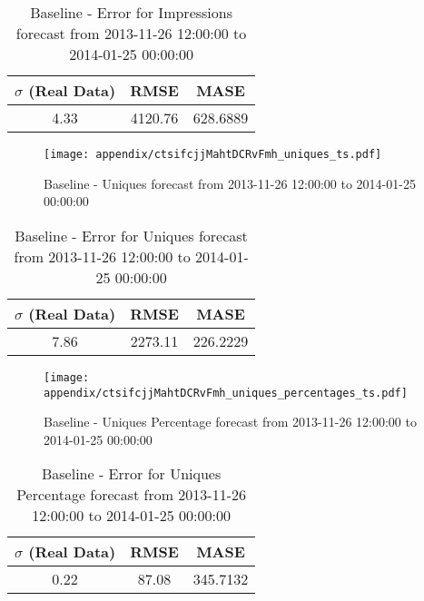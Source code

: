\begin{table}[H]
\centering
\footnotesize
\begin{tabular}{ccc}
$\sigma$ (Real Data) & RMSE & MASE   \\ \hline
4.33 & 4120.76 & 628.6889 \\
\end{tabular}

\vspace{0.5cm}

\caption{
Baseline - Error for Impressions forecast from 2013-11-26 12:00:00 to 2014-01-25 00:00:00}
\end{table}

\begin{figure}[H] \begin{center} \leavevmode
\texttt{[image: appendix/ctsifcjjMahtDCRvFmh\_uniques\_ts.pdf]} \caption{
Baseline - Uniques forecast from 2013-11-26 12:00:00 to 2014-01-25 00:00:00} \label{fig:appendix/ctsifcjjMahtDCRvFmh_uniques_ts.pdf} \end{center}
\end{figure}

\begin{table}[H]
\centering
\footnotesize
\begin{tabular}{ccc}
$\sigma$ (Real Data) & RMSE & MASE   \\ \hline
7.86 & 2273.11 & 226.2229 \\
\end{tabular}

\vspace{0.5cm}

\caption{
Baseline - Error for Uniques forecast from 2013-11-26 12:00:00 to 2014-01-25 00:00:00}
\end{table}

\begin{figure}[H] \begin{center} \leavevmode
\texttt{[image: appendix/ctsifcjjMahtDCRvFmh\_uniques\_percentages\_ts.pdf]} \caption{
Baseline - Uniques Percentage forecast from 2013-11-26 12:00:00 to 2014-01-25 00:00:00} \label{fig:appendix/ctsifcjjMahtDCRvFmh_uniques_percentages_ts.pdf} \end{center}
\end{figure}

\begin{table}[H]
\centering
\footnotesize
\begin{tabular}{ccc}
$\sigma$ (Real Data) & RMSE & MASE   \\ \hline
0.22 & 87.08 & 345.7132 \\
\end{tabular}

\vspace{0.5cm}

\caption{
Baseline - Error for Uniques Percentage forecast from 2013-11-26 12:00:00 to 2014-01-25 00:00:00}
\end{table}

